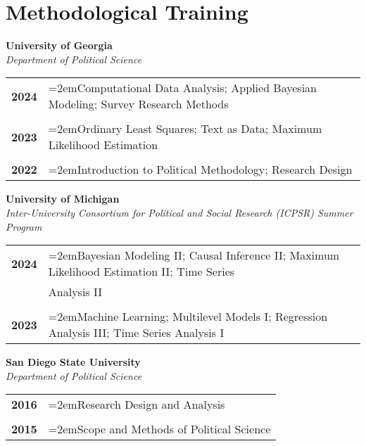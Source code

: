 \documentclass[letterpaper,12pt]{article}
\begin{document}
\section{Methodological Training}
\textbf{University of Georgia}\\
\textit{Department of Political Science}
\begin{xltabular}{\dimexpr\textwidth-0in}{p{.85in}X}
\textbf{2024} & \hangindent=2emComputational Data Analysis; Applied Bayesian Modeling; Survey Research Methods\\ \\
\textbf{2023} & \hangindent=2emOrdinary Least Squares; Text as Data; Maximum Likelihood Estimation\\ \\
\textbf{2022} & \hangindent=2emIntroduction to Political Methodology; Research Design
\end{xltabular}
\par
\textbf{University of Michigan}\\
\textit{Inter-University Consortium for Political and Social Research (ICPSR) Summer Program}
\begin{xltabular}{\dimexpr\textwidth-0in}{p{.85in}X}
\textbf{2024} & \hangindent=2emBayesian Modeling II; Causal Inference II; Maximum Likelihood Estimation II; Time Series \\
& \hspace{2em}Analysis II\\ \\
\textbf{2023} & \hangindent=2emMachine Learning; Multilevel Models I; Regression Analysis III; Time Series Analysis I
\end{xltabular}
\par
\textbf{San Diego State University}\\
\textit{Department of Political Science}
\begin{xltabular}{\dimexpr\textwidth-0in}{p{.85in}X}
\textbf{2016} & \hangindent=2emResearch Design and Analysis\\ \\
\textbf{2015} & \hangindent=2emScope and Methods of Political Science
\end{xltabular}

\end{document}
